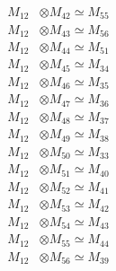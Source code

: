 \begin{align*}
M_{12} &\otimes M_{42} \simeq M_{55} \\
M_{12} &\otimes M_{43} \simeq M_{56} \\
M_{12} &\otimes M_{44} \simeq M_{51} \\
M_{12} &\otimes M_{45} \simeq M_{34} \\
M_{12} &\otimes M_{46} \simeq M_{35} \\
M_{12} &\otimes M_{47} \simeq M_{36} \\
M_{12} &\otimes M_{48} \simeq M_{37} \\
M_{12} &\otimes M_{49} \simeq M_{38} \\
M_{12} &\otimes M_{50} \simeq M_{33} \\
M_{12} &\otimes M_{51} \simeq M_{40} \\
M_{12} &\otimes M_{52} \simeq M_{41} \\
M_{12} &\otimes M_{53} \simeq M_{42} \\
M_{12} &\otimes M_{54} \simeq M_{43} \\
M_{12} &\otimes M_{55} \simeq M_{44} \\
M_{12} &\otimes M_{56} \simeq M_{39} \\
\end{align*}


